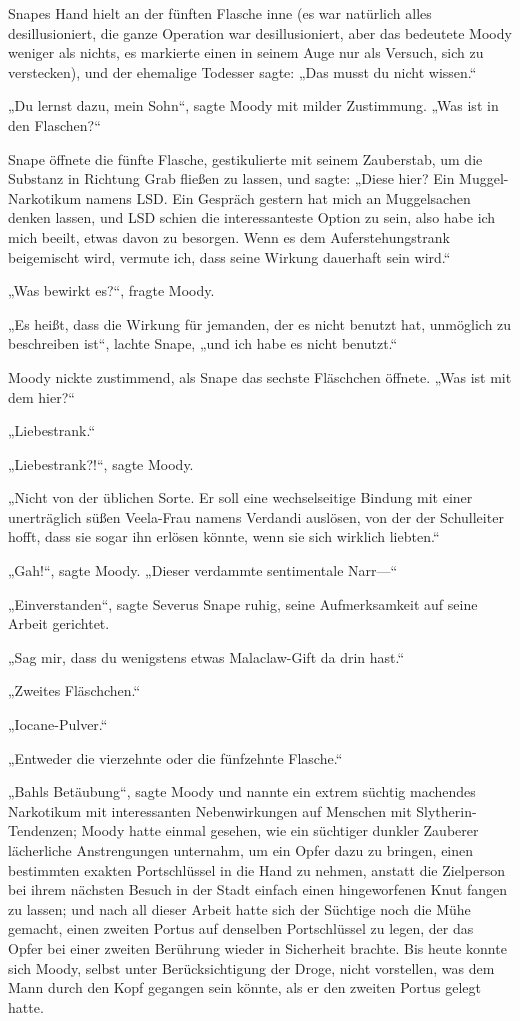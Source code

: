 {Snapes Hand hielt an der fünften Flasche inne (es war natürlich alles desillusioniert, die ganze Operation war desillusioniert, aber das bedeutete Moody weniger als nichts, es markierte einen in seinem Auge nur als Versuch, sich zu verstecken), und der ehemalige Todesser sagte: „Das musst du nicht wissen.“

„Du lernst dazu, mein Sohn“, sagte Moody mit milder Zustimmung. „Was ist in den Flaschen?“

Snape öffnete die fünfte Flasche, gestikulierte mit seinem Zauberstab, um die Substanz in Richtung Grab fließen zu lassen, und sagte: „Diese hier? Ein Muggel-Narkotikum namens LSD. Ein Gespräch gestern hat mich an Muggelsachen denken lassen, und LSD schien die interessanteste Option zu sein, also habe ich mich beeilt, etwas davon zu besorgen. Wenn es dem Auferstehungstrank beigemischt wird, vermute ich, dass seine Wirkung dauerhaft sein wird.“

„Was bewirkt es?“, fragte Moody.

„Es heißt, dass die Wirkung für jemanden, der es nicht benutzt hat, unmöglich zu beschreiben ist“, lachte Snape, „und ich habe es nicht benutzt.“

Moody nickte zustimmend, als Snape das sechste Fläschchen öffnete. „Was ist mit dem hier?“

„Liebestrank.“

„Liebestrank?!“, sagte Moody.

„Nicht von der üblichen Sorte. Er soll eine wechselseitige Bindung mit einer unerträglich süßen Veela-Frau namens Verdandi auslösen, von der der Schulleiter hofft, dass sie sogar ihn erlösen könnte, wenn sie sich wirklich liebten.“

„Gah!“, sagte Moody. „Dieser verdammte sentimentale Narr—“

„Einverstanden“, sagte Severus Snape ruhig, seine Aufmerksamkeit auf seine Arbeit gerichtet.

„Sag mir, dass du wenigstens etwas Malaclaw-Gift da drin hast.“

„Zweites Fläschchen.“

„Iocane-Pulver.“

„Entweder die vierzehnte oder die fünfzehnte Flasche.“

„Bahls Betäubung“, sagte Moody und nannte ein extrem süchtig machendes Narkotikum mit interessanten Nebenwirkungen auf Menschen mit Slytherin-Tendenzen; Moody hatte einmal gesehen, wie ein süchtiger dunkler Zauberer lächerliche Anstrengungen unternahm, um ein Opfer dazu zu bringen, einen bestimmten exakten Portschlüssel in die Hand zu nehmen, anstatt die Zielperson bei ihrem nächsten Besuch in der Stadt einfach einen hingeworfenen Knut fangen zu lassen; und nach all dieser Arbeit hatte sich der Süchtige noch die Mühe gemacht, einen zweiten Portus auf denselben Portschlüssel zu legen, der das Opfer bei einer zweiten Berührung wieder in Sicherheit brachte. Bis heute konnte sich Moody, selbst unter Berücksichtigung der Droge, nicht vorstellen, was dem Mann durch den Kopf gegangen sein könnte, als er den zweiten Portus gelegt hatte.

}
